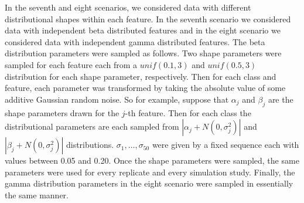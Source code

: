\documentclass{article}
\begin{document}
In the seventh and eight scenarios, we considered data with different
distributional shapes within each feature.  In the seventh scenario we
considered data with independent beta distributed features and in the eight
scenario we considered data with independent gamma distributed features.  The
beta distribution parameters were sampled as follows.  Two shape parameters were
sampled for each feature each from a $\mathit{unif}(0.1, 3)$ and
$\mathit{unif}(0.5, 3)$ distribution for each shape parameter, respectively.
Then for each class and feature, each parameter was transformed by taking the
absolute value of some additive Gaussian random noise.  So for example, suppose
that $\alpha_j$ and $\beta_j$ are the shape parameters drawn for the $j$-th
feature.  Then for each class the distributional parameters are each sampled
from $|\alpha_j + N(0, \sigma_j^2)|$ and $|\beta_j + N(0, \sigma_j^2)|$
distributions.  $\sigma_1, \dots, \sigma_{50}$ were given by a fixed sequence
each with values between 0.05 and 0.20.  Once the shape parameters were sampled,
the same parameters were used for every replicate and every simulation study.
Finally, the gamma distribution parameters in the eight scenario were sampled in
essentially the same manner.



\end{document}
